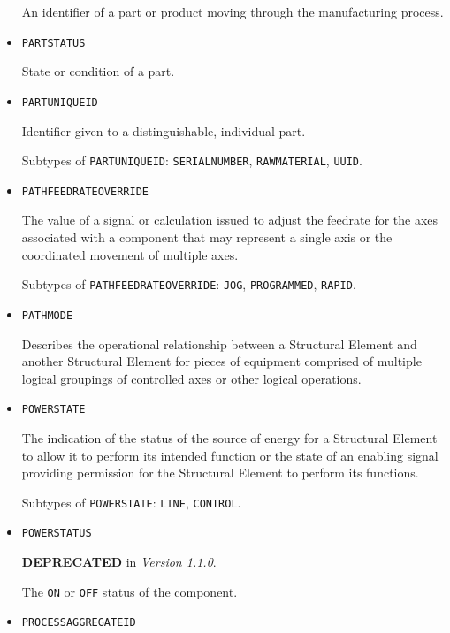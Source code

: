 \begin{itemize}
An identifier of a part or product moving through the manufacturing process.


\item \texttt{PART\textunderscore STATUS}  

State or condition of a part.


\item \texttt{PART\textunderscore UNIQUE\textunderscore ID}  

Identifier given to a distinguishable, individual part. 

Subtypes of \texttt{PART\textunderscore UNIQUE\textunderscore ID}: \texttt{SERIAL\textunderscore NUMBER}, \texttt{RAW\textunderscore MATERIAL}, \texttt{UUID}.

\item \texttt{PATH\textunderscore FEEDRATE\textunderscore OVERRIDE}  

The value of a signal or calculation issued to adjust the feedrate for the axes associated with a  component that may represent a single axis or the coordinated movement of multiple axes.

Subtypes of \texttt{PATH\textunderscore FEEDRATE\textunderscore OVERRIDE}: \texttt{JOG}, \texttt{PROGRAMMED}, \texttt{RAPID}.

\item \texttt{PATH\textunderscore MODE}  

Describes the operational relationship between a  \gls{Structural Element} and another  \gls{Structural Element} for pieces of equipment comprised of multiple logical groupings of controlled axes or other logical operations.


\item \texttt{POWER\textunderscore STATE}  

The indication of the status of the source of energy for a \gls{Structural Element} to allow it to perform its intended function or the state of an enabling signal providing permission for the \gls{Structural Element} to perform its functions.

Subtypes of \texttt{POWER\textunderscore STATE}: \texttt{LINE}, \texttt{CONTROL}.

\item \texttt{POWER\textunderscore STATUS}  

\textbf{DEPRECATED} in \textit{Version 1.1.0}.

The \texttt{ON} or \texttt{OFF} status of the component.


\item \texttt{PROCESS\textunderscore AGGREGATE\textunderscore ID}  


\end{itemize}

